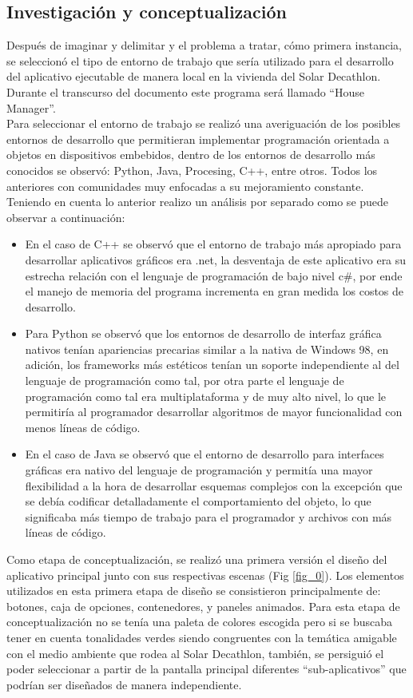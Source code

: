 \subsection{Investigación y conceptualización}
Después de imaginar y delimitar  y el problema a tratar, cómo primera instancia, se seleccionó el tipo de entorno de trabajo que sería utilizado para el desarrollo del aplicativo ejecutable de manera local en la vivienda del Solar Decathlon. Durante el transcurso del documento este programa será llamado ``House Manager''.
\vspace{0.5cm}\\
Para seleccionar el entorno de trabajo se realizó una averiguación de los posibles entornos de desarrollo que permitieran implementar programación orientada a objetos en dispositivos embebidos, dentro de los entornos de desarrollo más conocidos se observó: Python, Java, Procesing, C++, entre otros. Todos los anteriores con comunidades muy enfocadas a su mejoramiento constante. Teniendo en cuenta lo anterior realizo un análisis por separado como se puede observar a continuación:
\begin{itemize}
	\item En el caso de C++ se observó que el entorno de trabajo más apropiado para desarrollar aplicativos gráficos era .net, la desventaja de este aplicativo era su estrecha relación con el lenguaje de programación de bajo nivel c\#, por ende el manejo de memoria del programa incrementa en gran medida los costos de desarrollo.
	\item Para Python se observó que los entornos de desarrollo de interfaz gráfica nativos tenían apariencias precarias similar a la nativa de Windows 98, en adición, los frameworks más estéticos tenían un soporte independiente al del lenguaje de programación como tal, por otra parte el lenguaje de programación como tal era multiplataforma y de muy alto nivel, lo que le permitiría al programador desarrollar algoritmos de mayor funcionalidad con menos líneas de código.
	\item En el caso de Java se observó que el entorno de desarrollo para interfaces gráficas era nativo del lenguaje de programación y permitía una mayor flexibilidad a la hora de desarrollar esquemas complejos con la excepción que se debía codificar detalladamente el comportamiento del objeto, lo que significaba más tiempo de trabajo para el programador y archivos con más líneas de código.
\end{itemize}
Como etapa de conceptualización, se realizó una primera versión el diseño del aplicativo principal junto con sus respectivas escenas (Fig \ref{fig_0}). Los elementos utilizados en esta primera etapa de diseño se consistieron principalmente de: botones, caja de opciones, contenedores, y paneles animados. Para esta etapa de conceptualización no se tenía una paleta de colores escogida pero si se buscaba tener en cuenta tonalidades verdes siendo congruentes con la temática amigable con el medio ambiente que rodea al Solar Decathlon, también, se persiguió el poder seleccionar a partir de la pantalla principal diferentes ``sub-aplicativos'' que podrían ser diseñados de manera independiente.

